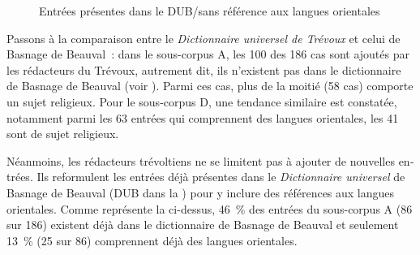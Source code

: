 \documentclass[output=paper,colorlinks,citecolor=brown,arabicfont,chinesefont,booklanguage=french]{langscibook}
\begin{document}
\begin{otherlanguage}{french}
\begin{figure}
\begin{floatrow}
{\caption{Entrées présentes dans le DUB\slash sans référence aux langues orientales}\label{fig:kassi:3}}
\end{floatrow}
\end{figure}

Passons à la comparaison entre le \emph{Dictionnaire universel de Trévoux} et celui de Basnage de Beauval~: dans le sous-corpus A, les 100 des 186 cas sont ajoutés par les rédacteurs du Trévoux, autrement dit, ils n’existent pas dans le dictionnaire de Basnage de Beauval (voir ). Parmi ces cas, plus de la moitié (58 cas) comporte un sujet religieux. Pour le sous-corpus D, une tendance similaire est constatée, notamment parmi les 63 entrées qui comprennent des langues orientales, les 41 sont de sujet religieux.

Néanmoins, les rédacteurs trévoltiens ne se limitent pas à ajouter de nouvelles entrées. Ils reformulent les entrées déjà présentes dans le \emph{Dictionnaire universel} de Basnage de Beauval (DUB dans la ) pour y inclure des références aux langues orientales. Comme représente la  ci-dessus, 46~\% des entrées du sous-corpus A (86 sur 186) existent déjà dans le dictionnaire de Basnage de Beauval et seulement 13~\% (25 sur 86) comprennent déjà des langues orientales.


\end{otherlanguage}
\end{document}
